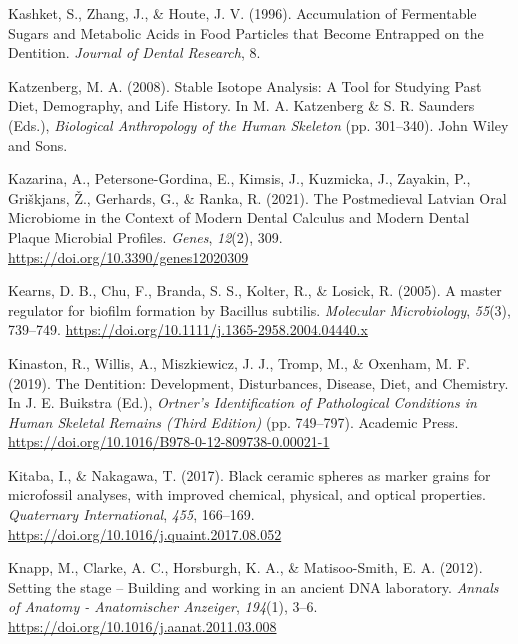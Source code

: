 \documentclass[
  letterpaper,
]{book}
\newlength{\cslhangindent}
\newlength{\cslentryspacingunit} %
\newenvironment{CSLReferences}[2] %
 {%
  \setlength{\parindent}{0pt}
  \ifodd #1
  \let\oldpar\par
  \def\par{\hangindent=\cslhangindent\oldpar}
  \fi
  \setlength{\parskip}{#2\cslentryspacingunit}
 }%
 {}
\begin{document}
\begin{CSLReferences}{1}{0}
\leavevmode{}%
Kashket, S., Zhang, J., \& Houte, J. V. (1996). Accumulation of
{Fermentable Sugars} and {Metabolic Acids} in {Food Particles} that
{Become Entrapped} on the {Dentition}. \emph{Journal of Dental
Research}, 8.

\leavevmode{}%
Katzenberg, M. A. (2008). Stable {Isotope Analysis}: {A Tool} for
{Studying Past Diet}, {Demography}, and {Life History}. In M. A.
Katzenberg \& S. R. Saunders (Eds.), \emph{Biological {Anthropology} of
the {Human Skeleton}} (pp. 301--340). {John Wiley and Sons}.

\leavevmode{}%
Kazarina, A., Petersone-Gordina, E., Kimsis, J., Kuzmicka, J., Zayakin,
P., Griškjans, Ž., Gerhards, G., \& Ranka, R. (2021). The {Postmedieval
Latvian Oral Microbiome} in the {Context} of {Modern Dental Calculus}
and {Modern Dental Plaque Microbial Profiles}. \emph{Genes},
\emph{12}(2), 309. \url{https://doi.org/10.3390/genes12020309}

\leavevmode{}%
Kearns, D. B., Chu, F., Branda, S. S., Kolter, R., \& Losick, R. (2005).
A master regulator for biofilm formation by {Bacillus} subtilis.
\emph{Molecular Microbiology}, \emph{55}(3), 739--749.
\url{https://doi.org/10.1111/j.1365-2958.2004.04440.x}

\leavevmode{}%
Kinaston, R., Willis, A., Miszkiewicz, J. J., Tromp, M., \& Oxenham, M.
F. (2019). The {Dentition}: {Development}, {Disturbances}, {Disease},
{Diet}, and {Chemistry}. In J. E. Buikstra (Ed.), \emph{Ortner's
{Identification} of {Pathological Conditions} in {Human Skeletal
Remains} ({Third Edition})} (pp. 749--797). {Academic Press}.
\url{https://doi.org/10.1016/B978-0-12-809738-0.00021-1}

\leavevmode{}%
Kitaba, I., \& Nakagawa, T. (2017). Black ceramic spheres as marker
grains for microfossil analyses, with improved chemical, physical, and
optical properties. \emph{Quaternary International}, \emph{455},
166--169. \url{https://doi.org/10.1016/j.quaint.2017.08.052}

\leavevmode{}%
Knapp, M., Clarke, A. C., Horsburgh, K. A., \& Matisoo-Smith, E. A.
(2012). Setting the stage -- {Building} and working in an ancient {DNA}
laboratory. \emph{Annals of Anatomy - Anatomischer Anzeiger},
\emph{194}(1), 3--6. \url{https://doi.org/10.1016/j.aanat.2011.03.008}


\end{CSLReferences}
\end{document}

